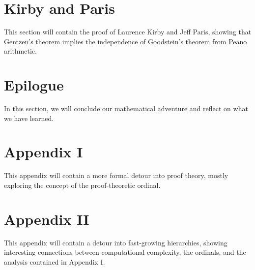 \documentclass[10pt]{article}
\begin{document}
\section{Kirby and Paris}
This section will contain the proof of Laurence Kirby and Jeff Paris, showing that Gentzen's theorem implies the independence of Goodstein's theorem from Peano arithmetic.

\section{Epilogue}
In this section, we will conclude our mathematical adventure and reflect on what we have learned.

\section{Appendix I}
This appendix will contain a more formal detour into proof theory, mostly exploring the concept of the proof-theoretic ordinal.

\section{Appendix II}
This appendix will contain a detour into fast-growing hierarchies, showing interesting connections between computational complexity, the ordinals, and the analysis contained in Appendix I.
\end{document}
